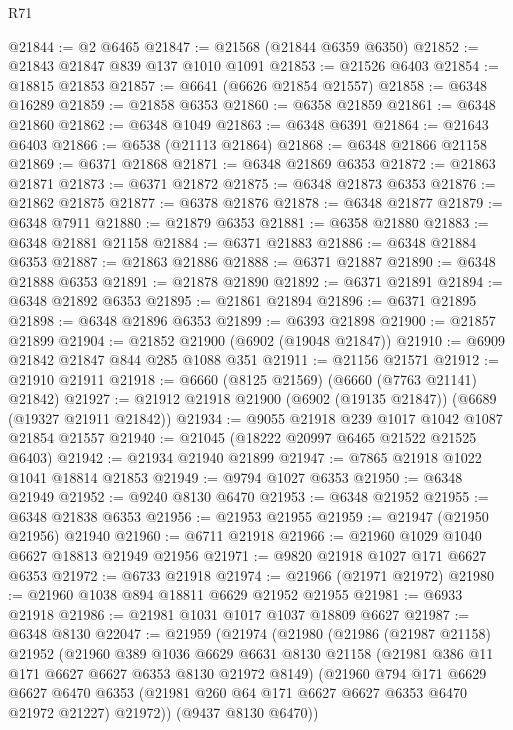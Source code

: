 \begin{lexlean}{R71}
\begin{coremodule}
@21844 := @2 @6465
@21847 := @21568 (@21844 @6359 @6350)
@21852 := @21843 @21847 @839 @137 @1010 @1091
@21853 := @21526 @6403
@21854 := @18815 @21853
@21857 := @6641 (@6626 @21854 @21557)
@21858 := @6348 @16289
@21859 := @21858 @6353
@21860 := @6358 @21859
@21861 := @6348 @21860
@21862 := @6348 @1049
@21863 := @6348 @6391
@21864 := @21643 @6403
@21866 := @6538 (@21113 @21864)
@21868 := @6348 @21866 @21158
@21869 := @6371 @21868
@21871 := @6348 @21869 @6353
@21872 := @21863 @21871
@21873 := @6371 @21872
@21875 := @6348 @21873 @6353
@21876 := @21862 @21875
@21877 := @6378 @21876
@21878 := @6348 @21877
@21879 := @6348 @7911
@21880 := @21879 @6353
@21881 := @6358 @21880
@21883 := @6348 @21881 @21158
@21884 := @6371 @21883
@21886 := @6348 @21884 @6353
@21887 := @21863 @21886
@21888 := @6371 @21887
@21890 := @6348 @21888 @6353
@21891 := @21878 @21890
@21892 := @6371 @21891
@21894 := @6348 @21892 @6353
@21895 := @21861 @21894
@21896 := @6371 @21895
@21898 := @6348 @21896 @6353
@21899 := @6393 @21898
@21900 := @21857 @21899
@21904 := @21852 @21900 (@6902 (@19048 @21847))
@21910 := @6909 @21842 @21847 @844 @285 @1088 @351
@21911 := @21156 @21571
@21912 := @21910 @21911
@21918 := @6660 (@8125 @21569) (@6660 (@7763 @21141) @21842)
@21927 := @21912 @21918 @21900 (@6902 (@19135 @21847)) (@6689 (@19327 @21911 @21842))
@21934 := @9055 @21918 @239 @1017 @1042 @1087 @21854 @21557
@21940 := @21045 (@18222 @20997 @6465 @21522 @21525 @6403)
@21942 := @21934 @21940 @21899
@21947 := @7865 @21918 @1022 @1041 @18814 @21853
@21949 := @9794 @1027 @6353
@21950 := @6348 @21949
@21952 := @9240 @8130 @6470
@21953 := @6348 @21952
@21955 := @6348 @21838 @6353
@21956 := @21953 @21955
@21959 := @21947 (@21950 @21956) @21940
@21960 := @6711 @21918
@21966 := @21960 @1029 @1040 @6627 @18813 @21949 @21956
@21971 := @9820 @21918 @1027 @171 @6627 @6353
@21972 := @6733 @21918
@21974 := @21966 (@21971 @21972)
@21980 := @21960 @1038 @894 @18811 @6629 @21952 @21955
@21981 := @6933 @21918
@21986 := @21981 @1031 @1017 @1037 @18809 @6627
@21987 := @6348 @8130
@22047 := @21959
    (@21974
      (@21980
        (@21986
          (@21987 @21158)
          @21952
          (@21960
            @389
            @1036
            @6629
            @6631
            @8130
            @21158
            (@21981 @386 @11 @171 @6627 @6627 @6353 @8130 @21972 @8149)
            (@21960
              @794
              @171
              @6629
              @6627
              @6470
              @6353
              (@21981 @260 @64 @171 @6627 @6627 @6353 @6470 @21972 @21227)
              @21972))
          (@9437 @8130 @6470))

\end{coremodule}
\end{lexlean}

